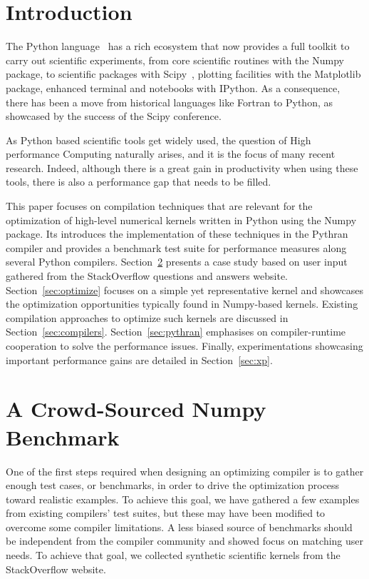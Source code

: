 \documentclass[10pt, preprint]{sigplanconf}
\begin{document}
\section{Introduction}

The Python language~\cite{rossum97} has a rich ecosystem that now provides a
full toolkit to carry out scientific experiments, from core scientific routines
with the Numpy package\cite{oliphant2007,numpyarray2011}, to scientific
packages with Scipy~\cite{scipy}, plotting facilities with the
Matplotlib package, enhanced terminal and notebooks with IPython. As a
consequence, there has been a move from historical languages like Fortran to
Python, as showcased by the success of the Scipy conference.

As Python based scientific tools get widely used, the question of High
performance Computing naturally arises, and it is the focus of many recent
research. Indeed, although there is a great gain in productivity when using
these tools, there is also a performance gap that needs to be filled.

This paper focuses on compilation techniques that are relevant for the
optimization of high-level numerical kernels written in Python using the Numpy
package. Its introduces the implementation of these techniques in the Pythran
compiler and provides a benchmark test suite for performance measures along
several Python compilers.
Section~\ref{sec:stackoverflow} presents a case study based on user
input gathered from the StackOverflow questions and answers website.
Section~\ref{sec:optimize} focuses on a simple yet representative kernel and
showcases the optimization opportunities typically found in Numpy-based
kernels. Existing compilation approaches to optimize such kernels are discussed
in Section~\ref{sec:compilers}. Section~\ref{sec:pythran} emphasises on
compiler-runtime cooperation to solve the performance issues.
Finally, experimentations showcasing important performance gains are detailed in
Section~\ref{sec:xp}.


\section{A Crowd-Sourced Numpy Benchmark}
\label{sec:stackoverflow}

One of the first steps required when designing an optimizing compiler is to
gather enough test cases, or benchmarks, in order to drive the optimization
process toward realistic examples. To achieve this goal, we have gathered a few
examples from existing compilers' test suites, but these may have been modified to
overcome some compiler limitations. A less biased source of benchmarks should
be independent from the compiler community and showed focus on matching user needs.
To achieve that goal, we collected synthetic scientific kernels from the
StackOverflow website.
\end{document}
